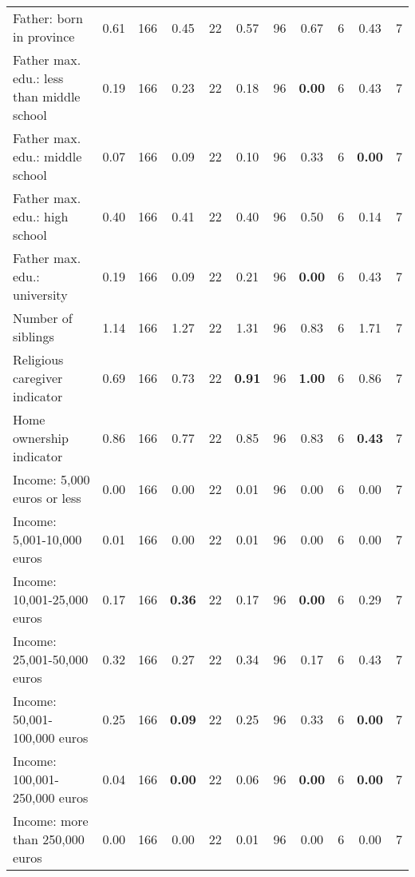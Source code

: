 \begin{tabular}{l c c c c c c c c c c}
Father: born in province &      0.61 &       166 &      0.45 &        22 &      0.57 &        96 &      0.67 &         6 &      0.43 &         7 \\
Father max. edu.: less than middle school &      0.19 &       166 &      0.23 &        22 &      0.18 &        96 & \textbf{     0.00} &         6 &      0.43 &         7 \\
Father max. edu.: middle school &      0.07 &       166 &      0.09 &        22 &      0.10 &        96 &      0.33 &         6 & \textbf{     0.00} &         7 \\
Father max. edu.: high school &      0.40 &       166 &      0.41 &        22 &      0.40 &        96 &      0.50 &         6 &      0.14 &         7 \\
Father max. edu.: university &      0.19 &       166 &      0.09 &        22 &      0.21 &        96 & \textbf{     0.00} &         6 &      0.43 &         7 \\
Number of siblings &      1.14 &       166 &      1.27 &        22 &      1.31 &        96 &      0.83 &         6 &      1.71 &         7 \\
Religious caregiver indicator &      0.69 &       166 &      0.73 &        22 & \textbf{     0.91} &        96 & \textbf{     1.00} &         6 &      0.86 &         7 \\
Home ownership indicator &      0.86 &       166 &      0.77 &        22 &      0.85 &        96 &      0.83 &         6 & \textbf{     0.43} &         7 \\
Income: 5,000 euros or less &      0.00 &       166 &      0.00 &        22 &      0.01 &        96 &      0.00 &         6 &      0.00 &         7 \\
Income: 5,001-10,000 euros &      0.01 &       166 &      0.00 &        22 &      0.01 &        96 &      0.00 &         6 &      0.00 &         7 \\
Income: 10,001-25,000 euros &      0.17 &       166 & \textbf{     0.36} &        22 &      0.17 &        96 & \textbf{     0.00} &         6 &      0.29 &         7 \\
Income: 25,001-50,000 euros &      0.32 &       166 &      0.27 &        22 &      0.34 &        96 &      0.17 &         6 &      0.43 &         7 \\
Income: 50,001-100,000 euros &      0.25 &       166 & \textbf{     0.09} &        22 &      0.25 &        96 &      0.33 &         6 & \textbf{     0.00} &         7 \\
Income: 100,001-250,000 euros &      0.04 &       166 & \textbf{     0.00} &        22 &      0.06 &        96 & \textbf{     0.00} &         6 & \textbf{     0.00} &         7 \\
Income: more than 250,000 euros &      0.00 &       166 &      0.00 &        22 &      0.01 &        96 &      0.00 &         6 &      0.00 &         7 \\
\bottomrule
\end{tabular}
